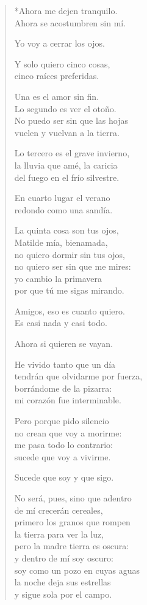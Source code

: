\documentclass[12pt]{article}
\begin{document}
\clearpage
{}
\begin{verse}

*Ahora me dejen tranquilo.\\
Ahora se acostumbren sin mí.  

Yo voy a cerrar los ojos.  

Y solo quiero cinco cosas,\\
cinco raíces preferidas.  

Una es el amor sin fin.\\
Lo segundo es ver el otoño.\\
No puedo ser sin que las hojas\\
vuelen y vuelvan a la tierra.  

Lo tercero es el grave invierno,\\
la lluvia que amé, la caricia\\
del fuego en el frío silvestre.  

En cuarto lugar el verano\\
redondo como una sandía.  

La quinta cosa son tus ojos,\\
Matilde mía, bienamada,\\
no quiero dormir sin tus ojos,\\
no quiero ser sin que me mires:\\
yo cambio la primavera\\
por que tú me sigas mirando.  

Amigos, eso es cuanto quiero.\\
Es casi nada y casi todo.  

Ahora si quieren se vayan.  

He vivido tanto que un día\\
tendrán que olvidarme por fuerza,\\
borrándome de la pizarra:\\
mi corazón fue interminable.  

Pero porque pido silencio\\
no crean que voy a morirme:\\
me pasa todo lo contrario:\\
sucede que voy a vivirme.  

Sucede que soy y que sigo.  

No será, pues, sino que adentro\\
de mí crecerán cereales,\\
primero los granos que rompen\\
la tierra para ver la luz,\\
pero la madre tierra es oscura:\\
y dentro de mí soy oscuro:\\
soy como un pozo en cuyas aguas\\
la noche deja sus estrellas\\
y sigue sola por el campo.  


\end{verse}
\end{document}
